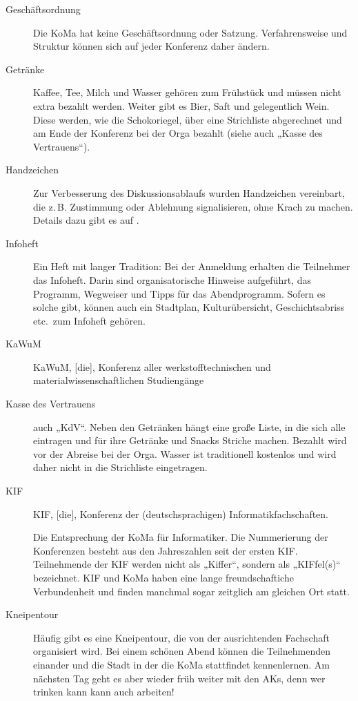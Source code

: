 \begin{description}
\item[Geschäftsordnung]
    Die KoMa hat keine Geschäftsordnung oder Satzung. Verfahrensweise und Struktur können sich auf jeder Konferenz daher ändern.

\item[Getränke]
    Kaffee, Tee, Milch und Wasser gehören zum Frühstück und müssen nicht extra bezahlt werden. Weiter gibt es Bier, Saft und gelegentlich Wein. Diese werden, wie die Schokoriegel, über eine Strichliste abgerechnet und am Ende der Konferenz bei der Orga bezahlt (siehe auch „Kasse des Vertrauens“).

\item[Handzeichen]
    Zur Verbesserung des Diskussionsablaufs wurden Handzeichen vereinbart, die z.\,B. Zustimmung oder Ablehnung signalisieren, ohne Krach	zu machen. Details dazu gibt es auf .

\item[Infoheft]
    Ein Heft mit langer Tradition: Bei der Anmeldung erhalten die Teilnehmer das Infoheft. Darin sind organisatorische Hinweise aufgeführt, das Programm, Wegweiser und Tipps für das Abendprogramm. Sofern es solche gibt, können auch ein Stadtplan, Kulturübersicht,	Geschichtsabriss etc.\ zum Infoheft gehören.

\item[KaWuM]
    KaWuM, [die], Konferenz aller werkstofftechnischen und materialwissenschaftlichen Studiengänge

\item[Kasse des Vertrauens]
    auch „KdV“. Neben den Getränken hängt eine große Liste, in die sich alle eintragen und für ihre Getränke und Snacks Striche machen.  Bezahlt wird vor der Abreise bei der Orga.  Wasser ist traditionell kostenlos und wird daher nicht in die Strichliste eingetragen.	

\item[KIF]
    KIF, [die], Konferenz der (deutschsprachigen) Informatikfachschaften.

	Die Entsprechung der KoMa für Informatiker. Die Nummerierung der Konferenzen besteht aus den Jahreszahlen seit der ersten KIF. Teilnehmende der KIF werden nicht als „Kiffer“, sondern als „KIFfel(s)“ bezeichnet. KIF und KoMa haben eine lange freundschaftiche Verbundenheit und finden manchmal sogar zeitglich am gleichen Ort statt.

\item[Kneipentour]
    Häufig gibt es eine Kneipentour, die von der ausrichtenden Fachschaft organisiert wird. Bei einem schönen Abend können die Teilnehmenden einander und die Stadt in der die KoMa stattfindet kennenlernen. Am nächsten Tag geht es aber wieder früh weiter mit den AKs, denn wer trinken kann kann auch arbeiten!


\end{description}
